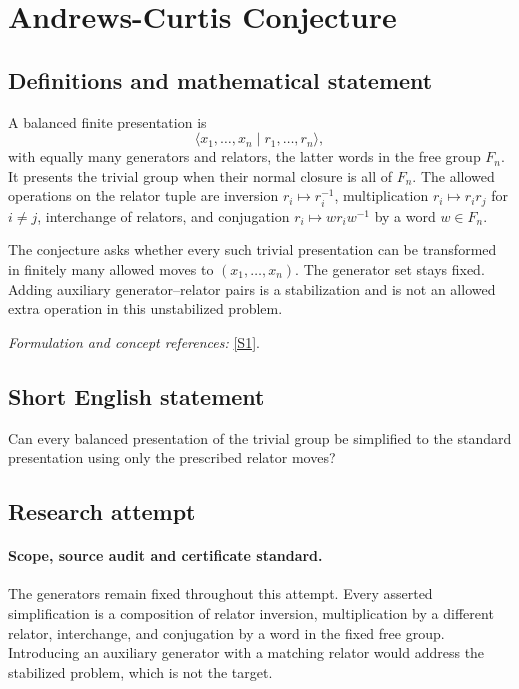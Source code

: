 \documentclass[11pt]{article}
\begin{document}
\section*{\texorpdfstring{Andrews-Curtis Conjecture}{Andrews-Curtis Conjecture}}\label{1108}
\subsection{Definitions and mathematical statement}
A balanced finite presentation is
\[
 \langle x_1,\ldots,x_n\mid r_1,\ldots,r_n\rangle,
\]
with equally many generators and relators, the latter words in the free group $F_n$. It presents the trivial group when their normal closure is all of $F_n$. The allowed operations on the relator tuple are inversion $r_i\mapsto r_i^{-1}$, multiplication $r_i\mapsto r_ir_j$ for $i\ne j$, interchange of relators, and conjugation $r_i\mapsto w r_iw^{-1}$ by a word $w\in F_n$.

The conjecture asks whether every such trivial presentation can be transformed in finitely many allowed moves to $(x_1,\ldots,x_n)$. The generator set stays fixed. Adding auxiliary generator--relator pairs is a stabilization and is not an allowed extra operation in this unstabilized problem.
\par\smallskip\textit{Formulation and concept references:} \href{https://link.springer.com/article/10.1007/s10817-026-09759-8}{[S1]}.

\subsection{Short English statement}
Can every balanced presentation of the trivial group be simplified to the standard presentation using only the prescribed relator moves?
\subsection{Research attempt}

\paragraph{Scope, source audit and certificate standard.}
The generators remain fixed throughout this attempt. Every asserted
simplification is a composition of relator inversion, multiplication
by a different relator, interchange, and conjugation by a word in the
fixed free group. Introducing an auxiliary generator with a matching
relator would address the stabilized problem, which is not the target.
\end{document}

